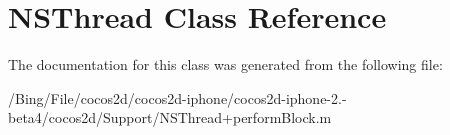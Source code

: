 \hypertarget{class_n_s_thread}{\section{N\-S\-Thread Class Reference}
\label{class_n_s_thread}
}


The documentation for this class was generated from the following file\-:\begin{DoxyCompactItemize}
\item 
/\-Bing/\-File/cocos2d/cocos2d-\/iphone/cocos2d-\/iphone-\/2.-\/beta4/cocos2d/\-Support/N\-S\-Thread+perform\-Block.\-m\end{DoxyCompactItemize}
